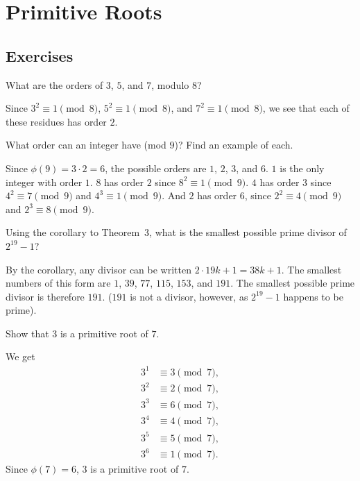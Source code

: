 \chapter{Primitive Roots}

\section{Exercises}

 What are the orders of $3$, $5$, and $7$, modulo $8$?
\begin{solution}
  Since $3^2\equiv1\pmod8$, $5^2\equiv1\pmod8$, and
  $7^2\equiv1\pmod8$, we see that each of these residues has order
  $2$.
\end{solution}

 What order can an integer have (mod $9$)? Find an example
of each.
\begin{solution}
  Since $\phi(9) = 3\cdot2 = 6$, the possible orders are $1$, $2$,
  $3$, and $6$. $1$ is the only integer with order $1$. $8$ has order
  $2$ since $8^2\equiv 1\pmod9$. $4$ has order $3$ since
  $4^2 \equiv 7\pmod9$ and $4^3\equiv1\pmod9$. And $2$ has order $6$,
  since $2^2\equiv4\pmod9$ and $2^3\equiv8\pmod9$.
\end{solution}

 Using the corollary to Theorem~3, what is the smallest
possible prime divisor of $2^{19} - 1$?
\begin{solution}
  By the corollary, any divisor can be written
  $2\cdot19k + 1 = 38k + 1$. The smallest numbers of this form are
  $1$, $39$, $77$, $115$, $153$, and $191$. The smallest possible
  prime divisor is therefore $191$. ($191$ is not a divisor, however,
  as $2^{19} - 1$ happens to be prime).
\end{solution}

 Show that $3$ is a primitive root of $7$.
\begin{solution}
  We get
  \begin{align*}
    3^1 &\equiv 3\pmod7, \\
    3^2 &\equiv 2\pmod7, \\
    3^3 &\equiv 6\pmod7, \\
    3^4 &\equiv 4\pmod7, \\
    3^5 &\equiv 5\pmod7, \\
    3^6 &\equiv 1\pmod7.
  \end{align*}
  Since $\phi(7) = 6$, $3$ is a primitive root of $7$.
\end{solution}

